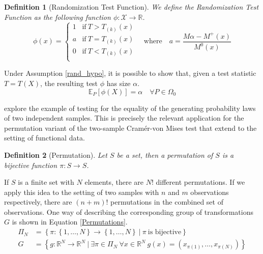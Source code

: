 \documentclass[12pt, a4paper]{article}
\theoremstyle{MAstyle} \newtheorem{assumption}{Assumption}[section]
\theoremstyle{MAstyle} \newtheorem{definition}{Definition}[section]
\theoremstyle{MAstyle} \newtheorem{theorem}{Theorem}[section]
\begin{document}
			\begin{definition}[Randomization Test Function]\label{RandTestFunc}
				We define the Randomization Test Function as the following function $\phi: \mathcal{X} \rightarrow \mathbb{R}$.
					\begin{equation*}
						\phi(x) = \begin{cases}
							1 &\text{if} \ T > T_{(k)}(x) \\
							a &\text{if} \ T = T_{(k)}(x) \\
							0 &\text{if} \ T < T_{(k)}(x) \\
						\end{cases} \quad \text{where} \quad
						a = \frac{M\alpha - M^{+}(x)}{M^{0}(x)}
					\end{equation*}
				
			\end{definition}
			Under Assumption \ref{rand_hypo}, it is possible to show that, given a test statistic $T = T(X)$, the resulting test $\phi$ has size $\alpha$.
			\begin{equation}
				\mathbb{E}_{P}\left[\phi(X)\right] = \alpha \quad \forall P \in \Omega_0
			\end{equation}
			
		
			\cite{lehmann_testing_2005} explore the example of testing for the equality of the generating probability laws of two independent samples. This is precisely the relevant application for the permutation variant of the two-sample Cram\'{e}r-von Mises test that \cite{bugni_permutation_2021} extend to the setting of functional data. \\
			
			\begin{definition}[Permutation]
				Let $S$ be a set, then a permutation of $S$ is a bijective function $\pi: S \rightarrow S$.
			\end{definition}
			If $S$ is a finite set with $N$ elements, there are $N!$ different permutations. If we apply this idea to the setting of two samples with $n$ and $m$ observations respectively, there are $(n+m)!$ permutations in the combined set of observations. One way of describing the corresponding group of transformations $G$ is shown in Equation \ref{Permutations}.
			\begin{equation}\label{Permutations}
				\begin{split}
					\Pi_N &= \left\{\pi: \left\{1, \dots, N \right\} \rightarrow \left\{1, \dots, N \right\} \ \vert \ \pi \ \text{is bijective} \right\} \\
					G &= \left\{g:\mathbb{R}^N \rightarrow \mathbb{R}^N \ \vert \ \exists \pi \in \Pi_N \ \forall x \in \mathbb{R}^N \ g(x) = \left(x_{\pi(1)}, \dots, x_{\pi(N)}\right) \right\}
				\end{split}
			\end{equation}
			
\end{document}
